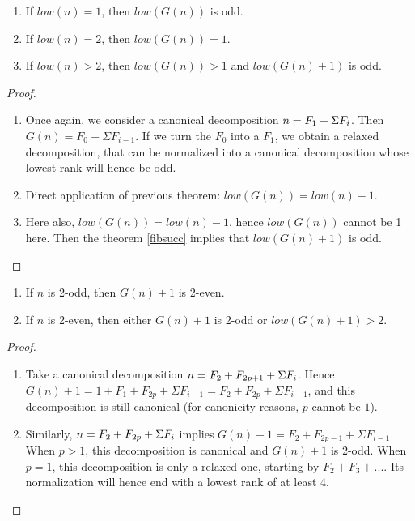 \documentclass[a4paper,11pt]{article}
\begin{document}
\begin{theorem}\label{Gclass2}
\noindent
\begin{enumerate}
\item If $low(n)=1$, then $low(G(n))$ is odd.
\item If $low(n)=2$, then $low(G(n))=1$.
\item If $low(n)>2$, then $low(G(n))>1$ and $low(G(n)+1)$ is odd.
\end{enumerate}
\end{theorem}
\begin{proof}
\noindent
\begin{enumerate}
\item Once again, we consider a canonical decomposition
$n = F_1 + \Sigma F_i$. Then $G(n) = F_0 + \Sigma F_{i-1}$. If we
turn the $F_0$ into a $F_1$, we obtain a relaxed decomposition,
that can be normalized into a canonical decomposition whose
lowest rank will hence be odd.
\item Direct application of previous theorem: $low(G(n))=low(n)-1$.
\item Here also, $low(G(n))=low(n)-1$, hence $low(G(n))$ cannot
be 1 here. Then the theorem \ref{fibsucc} implies that $low(G(n)+1)$ is odd.
\end{enumerate}
\end{proof}

\begin{theorem}\label{Gtwo}
\noindent
\begin{enumerate}
\item If $n$ is 2-odd, then $G(n)+1$ is 2-even.
\item If $n$ is 2-even, then either $G(n)+1$ is 2-odd or $low(G(n)+1)>2$.
\end{enumerate}
\end{theorem}
\begin{proof}
\noindent
\begin{enumerate}
\item Take a canonical decomposition $n=F_2+F_{2p+1}+\Sigma F_i$.
Hence $G(n)+1=1+F_1+F_{2p}+\Sigma F_{i-1}=F_2+F_{2p}+\Sigma F_{i-1}$,
and this decomposition is still canonical (for canonicity reasons,
$p$ cannot be $1$).
\item Similarly, $n=F_2+F_{2p}+\Sigma F_i$ implies
$G(n)+1=F_2+F_{2p-1}+\Sigma F_{i-1}$. When $p>1$, this decomposition
is canonical and $G(n)+1$ is 2-odd. When $p=1$, this decomposition
is only a relaxed one, starting by $F_2+F_3+...$. Its normalization
will hence end with a lowest rank of at least 4.
\end{enumerate}
\end{proof}
\end{document}
